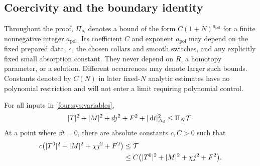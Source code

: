 \subsection{Coercivity and the boundary identity}

Throughout the proof, $\Pi_N$ denotes a bound of the form
$C(1+N)^{a_{\mathrm{pol}}}$ for a finite nonnegative integer $a_{\mathrm{pol}}$.  Its coefficient $C$ and
exponent $a_{\mathrm{pol}}$ may depend on the fixed prepared data, $\epsilon$, the chosen
collars and smooth switches, and any explicitly fixed small absorption
constant.  They never depend on $R$, a homotopy parameter, or a solution.
Different occurrences may denote larger such bounds.  Constants denoted
by $C(N)$ in later fixed-$N$ analytic estimates have no polynomial
restriction and will not enter a limit requiring polynomial control.

\begin{lemma}\label{four:sys:coercivity-lemma}
For all inputs in \eqref{four:sys:variables},
\begin{equation}\label{four:eq:coercivity}
 |T|^2+|M|^2+d j^2+F^2+|\,\mathrm d t|_{A_d}^2\le\Pi_N\mathcal T.
\end{equation}
At a point where $\dd t=0$, there are absolute constants $c,C>0$ such
that
\begin{equation}\label{four:sys:stationary-coercivity}
 \begin{aligned}
 c\bigl(|T^0|^2+|M|^2+\chi j^2+F^2\bigr)&\le\mathcal T\\
 &\le C\bigl(|T^0|^2+|M|^2+\chi j^2+F^2\bigr).
 \end{aligned}
\end{equation}
\end{lemma}

